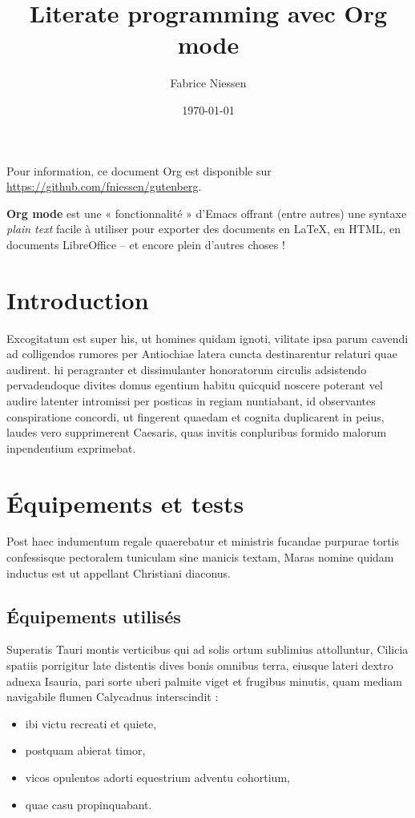 \documentclass[french]{report}
\author{Fabrice Niessen}
\date{\today}
\title{Literate programming avec Org mode}
\begin{document}
\maketitle
Pour information, ce document Org est disponible sur
\url{https://github.com/fniessen/gutenberg}.

\textbf{Org mode} est une « fonctionnalité » d'Emacs offrant (entre autres) une syntaxe
\emph{plain text} facile à utiliser pour exporter des documents en \LaTeX{}, en HTML, en
documents LibreOffice -- et encore plein d'autres choses !

\chapter{Introduction}
\label{sec:orge30f565}

Excogitatum est super his, ut homines quidam ignoti, vilitate ipsa parum cavendi
ad colligendos rumores per Antiochiae latera cuncta destinarentur relaturi quae
audirent. hi peragranter et dissimulanter honoratorum circulis adsistendo
pervadendoque divites domus egentium habitu quicquid noscere poterant vel audire
latenter intromissi per posticas in regiam nuntiabant, id observantes
conspiratione concordi, ut fingerent quaedam et cognita duplicarent in peius,
laudes vero supprimerent Caesaris, quas invitis conpluribus formido malorum
inpendentium exprimebat.

\chapter{Équipements et tests}
\label{sec:orgb485ac4}

Post haec indumentum regale quaerebatur et ministris fucandae purpurae tortis
confessisque pectoralem tuniculam sine manicis textam, Maras nomine quidam
inductus est ut appellant Christiani diaconus.

\section{Équipements utilisés}
\label{sec:org46c8d78}

Superatis Tauri montis verticibus qui ad solis ortum sublimius attolluntur,
Cilicia spatiis porrigitur late distentis dives bonis omnibus terra, eiusque
lateri dextro adnexa Isauria, pari sorte uberi palmite viget et frugibus
minutis, quam mediam navigabile flumen Calycadnus interscindit :

\begin{itemize}
\item ibi victu recreati et quiete,
\item postquam abierat timor,
\item vicos opulentos adorti equestrium adventu cohortium,
\item quae casu propinquabant.
\end{itemize}
\end{document}
